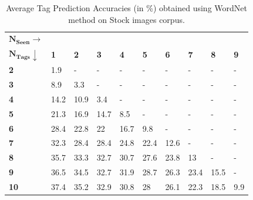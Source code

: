 \begin{table}[!htbp]
\fontsize{8pt}{1em}\selectfont
\begin{center}
\caption{Average Tag Prediction Accuracies (in \%) obtained using WordNet method on Stock images corpus.}
\label{tab:TPGWS30Wordnet}
\begin{tabular}{|p{1.5cm}|p{0.5cm}|p{0.5cm}|p{0.5cm}|p{0.5cm}|p{0.5cm}|p{0.5cm}|p{0.5cm}|p{0.5cm}|p{0.5cm}|}
		\hline
		{$\boldsymbol{N_{Seen} \rightarrow}$} & &  &  &  & &  &  &  &\\ 
		{$\boldsymbol{N_{Tags}}\downarrow $} & \textbf{1} & \textbf{2} & \textbf{3} & \textbf{4} & \textbf{5}  & \textbf{6} & \textbf{7} & \textbf{8} & \textbf{9} \\ 
		\hline 		
		\textbf{2} & 1.9&-&-&-&-&-&-&-&- \\
		\hline
		\textbf{3} & 8.9&3.3&-&-&-&-&-&-&- \\
		\hline
		\textbf{4} & 14.2&10.9&3.4&-&-&-&-&-&- \\
		\hline
		\textbf{5} & 21.3&16.9&14.7&8.5&-&-&-&-&- \\
		\hline
		\textbf{6} & 28.4&22.8&22&16.7&9.8&-&-&-&- \\
		\hline
		\textbf{7} & 32.3&28.4&28.4&24.8&22.4&12.6&-&-&- \\
		\hline
		\textbf{8} & 35.7&33.3&32.7&30.7&27.6&23.8&13&-&- \\
		\hline
		\textbf{9} & 36.5&34.5&32.7&31.9&28.7&26.3&23.4&15.5&- \\
		\hline
		\textbf{10} & 37.4&35.2&32.9&30.8&28&26.1&22.3&18.5&9.9 \\
		\hline
\end{tabular}
\vspace{-2.5mm}
\end{center}
\end{table}
